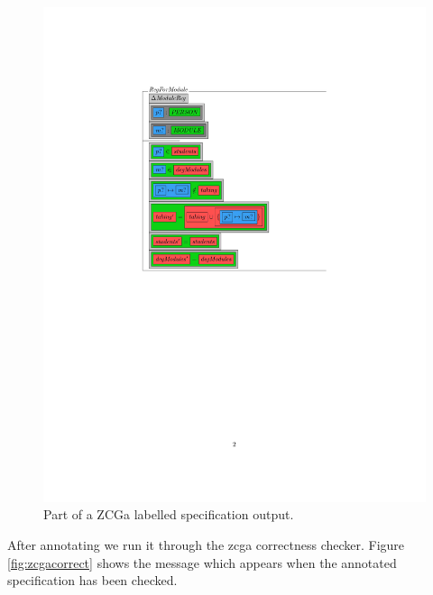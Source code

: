 \begin{figure}[H]
\begin{minipage}{0.45\textwidth}
\includegraphics[clip, trim=5.5cm 13cm 8.5cm 4cm, width=1.00\textwidth]{Figures/fullexample/2.jpg}
\vspace{-0.2in}
\caption{Part of a ZCGa labelled specification output. \label{fig:zcgaschemaout}}
\end{minipage}
\end{figure}

After annotating we run it through the \gls{zcga} correctness checker. Figure \ref{fig:zcgacorrect} shows the message which appears when the annotated specification has been checked. 

